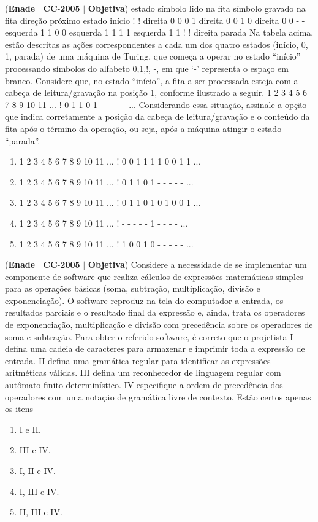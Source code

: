\documentclass{exam}
\begin{document}
\begin{questions}
\question (\textbf{Enade} $|$ \textbf{CC}-\textbf{2005} $|$ \textbf{Objetiva})
estado
símbolo
lido na fita
símbolo gravado
na fita
direção
próximo
estado
início ! ! direita 0
0 0 1 direita 0
0 1 0 direita 0
0 - - esquerda 1
1 0 0 esquerda 1
1 1 1 esquerda 1
1 ! ! direita parada
Na tabela acima, estão descritas as ações correspondentes a cada
um dos quatro estados (início, 0, 1, parada) de uma máquina de
Turing, que começa a operar no estado “início” processando
símbolos do alfabeto {0,1,!, -}, em que ‘-’ representa o espaço
em branco. Considere que, no estado “início”, a fita a ser
processada esteja com a cabeça de leitura/gravação na posição 1,
conforme ilustrado a seguir.
1 2 3 4 5 6 7 8 9 10 11 ...
! 0 1 1 0 1 - - - - - ...
Considerando essa situação, assinale a opção que indica
corretamente a posição da cabeça de leitura/gravação e o conteúdo
da fita após o término da operação, ou seja, após a máquina atingir
o estado “parada”.
	\begin{enumerate}[label=\alph*)]
		\item 
1 2 3 4 5 6 7 8 9 10 11 ...
! 0 0 1 1 1 1 0 0 1 1 ...
		\item 
1 2 3 4 5 6 7 8 9 10 11 ...
! 0 1 1 0 1 - - - - - ...
		\item 
1 2 3 4 5 6 7 8 9 10 11 ...
! 0 1 1 0 1 0 1 0 0 1 ...
		\item 
1 2 3 4 5 6 7 8 9 10 11 ...
! - - - - - 1 - - - - ...
		\item 
1 2 3 4 5 6 7 8 9 10 11 ...
! 1 0 0 1 0 - - - - - ...
	\end{enumerate}

\question (\textbf{Enade} $|$ \textbf{CC}-\textbf{2005} $|$ \textbf{Objetiva})
Considere a necessidade de se implementar um componente de
software que realiza cálculos de expressões matemáticas simples
para as operações básicas (soma, subtração, multiplicação, divisão
e exponenciação). O software reproduz na tela do computador a
entrada, os resultados parciais e o resultado final da expressão e,
ainda, trata os operadores de exponenciação, multiplicação e
divisão com precedência sobre os operadores de soma e subtração.
Para obter o referido software, é correto que o projetista
I defina uma cadeia de caracteres para armazenar e imprimir toda
a expressão de entrada.
II defina uma gramática regular para identificar as expressões
aritméticas válidas.
III defina um reconhecedor de linguagem regular com autômato
finito determinístico.
IV especifique a ordem de precedência dos operadores com uma
notação de gramática livre de contexto.
Estão certos apenas os itens
	\begin{enumerate}[label=\alph*)]
		\item  I e II. 
		\item  III e IV. 
		\item  I, II e IV.
		\item  I, III e IV.
		\item  II, III e IV.
	\end{enumerate}


\end{questions}
\end{document}
